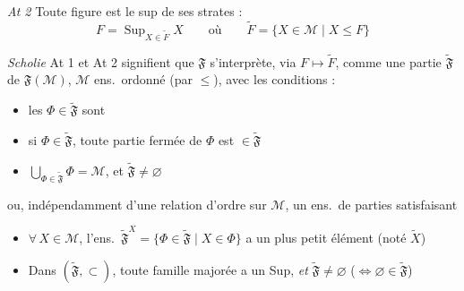 \documentclass[11pt,a4paper]{article}
\begin{document}
\emph{At 2} \quad Toute figure est le sup de ses strates :
\[
  F = \mathop{\mathrm{Sup}}_{X \in \widetilde{F}} X \qquad \text{où} \qquad \widetilde{F} = \lbrace X \in \mathcal{M} \mid X \leq F \rbrace
\]


\emph{Scholie} \quad At 1 et At 2 signifient que $\mathfrak{F}$ s'interprète, via $F \mapsto \widetilde{F}$, comme une partie $\widetilde{\mathfrak{F}}$ de $\mathfrak{F}(\mathcal{M})$, $\mathcal{M}$ ens.\ ordonné (par $\leq$), avec les conditions :
\begin{itemize}
  \item[a)] les $\Phi \in \widetilde{\mathfrak{F}}$ sont 
  \item[b)] si $\Phi \in \widetilde{\mathfrak{F}}$, toute partie fermée de $\Phi$ est $\in \widetilde{\mathfrak{F}}$
  \item[c)]  $\bigcup_{\Phi \in \widetilde{\mathfrak{F}}} \Phi = \mathcal{M}$, et $\widetilde{\mathfrak{F}} \neq \varnothing$
\end{itemize}

ou, indépendamment d'une relation d'ordre sur $\mathcal{M}$, un ens.\ de parties satisfaisant
\begin{itemize}
  \item[b')] $\forall\, X \in \mathcal{M}$, l'ens.\ $\widetilde{\mathfrak{F}}^{X} = \lbrace \Phi \in \widetilde{\mathfrak{F}} \mid X \in \Phi \rbrace$ a un plus petit élément (noté $\widetilde{X}$)
  \item[d')] Dans $(\widetilde{\mathfrak{F}}, \subset)$, toute famille majorée a un Sup, \emph{et} $\widetilde{\mathfrak{F}} \neq \varnothing$ ($\Leftrightarrow \varnothing \in \widetilde{\mathfrak{F}}$)
\end{itemize}

\end{document}
